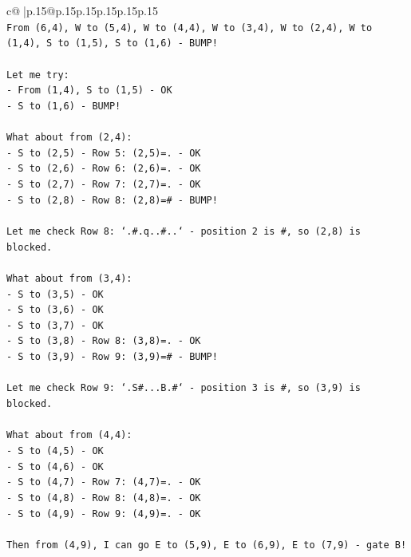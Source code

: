 \documentclass{article}
\begin{document}
{\begin{supertabular}{c@{$\;$}|p{.15\linewidth}@{}p{.15\linewidth}p{.15\linewidth}p{.15\linewidth}p{.15\linewidth}p{.15\linewidth}}
{{{\\ 
\texttt{From (6,4), W to (5,4), W to (4,4), W to (3,4), W to (2,4), W to (1,4), S to (1,5), S to (1,6) {-} BUMP!} \\
\\ 
\texttt{Let me try:} \\
\texttt{{-} From (1,4), S to (1,5) {-} OK} \\
\texttt{{-} S to (1,6) {-} BUMP!} \\
\\ 
\texttt{What about from (2,4):} \\
\texttt{{-} S to (2,5) {-} Row 5: (2,5)=. {-} OK} \\
\texttt{{-} S to (2,6) {-} Row 6: (2,6)=. {-} OK} \\
\texttt{{-} S to (2,7) {-} Row 7: (2,7)=. {-} OK} \\
\texttt{{-} S to (2,8) {-} Row 8: (2,8)=\# {-} BUMP!} \\
\\ 
\texttt{Let me check Row 8: `.\#.q..\#..` {-} position 2 is \#, so (2,8) is blocked.} \\
\\ 
\texttt{What about from (3,4):} \\
\texttt{{-} S to (3,5) {-} OK} \\
\texttt{{-} S to (3,6) {-} OK} \\
\texttt{{-} S to (3,7) {-} OK} \\
\texttt{{-} S to (3,8) {-} Row 8: (3,8)=. {-} OK} \\
\texttt{{-} S to (3,9) {-} Row 9: (3,9)=\# {-} BUMP!} \\
\\ 
\texttt{Let me check Row 9: `.S\#...B.\#` {-} position 3 is \#, so (3,9) is blocked.} \\
\\ 
\texttt{What about from (4,4):} \\
\texttt{{-} S to (4,5) {-} OK} \\
\texttt{{-} S to (4,6) {-} OK} \\
\texttt{{-} S to (4,7) {-} Row 7: (4,7)=. {-} OK} \\
\texttt{{-} S to (4,8) {-} Row 8: (4,8)=. {-} OK} \\
\texttt{{-} S to (4,9) {-} Row 9: (4,9)=. {-} OK} \\
\\ 
\texttt{Then from (4,9), I can go E to (5,9), E to (6,9), E to (7,9) {-} gate B!} \\
\\ 
}}}
\end{supertabular}}
\end{document}
